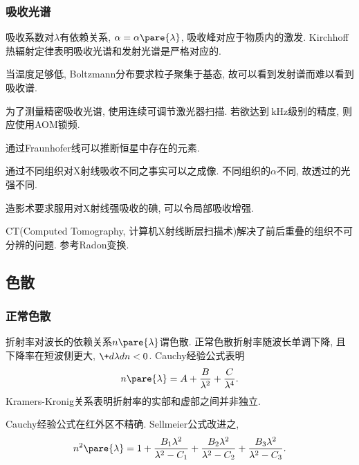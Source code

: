 \documentclass{ctexart}
\begin{document}

\subsubsection{吸收光谱} %
\label{ssub:吸收光谱}

吸收系数对$\lambda$有依赖关系, $\alpha = \alpha\pare{\lambda}$, 吸收峰对应于物质内的激发. Kirchhoff热辐射定律表明吸收光谱和发射光谱是严格对应的.
\begin{remark}
    当温度足够低, Boltzmann分布要求粒子聚集于基态, 故可以看到发射谱而难以看到吸收谱.
\end{remark}
\begin{remark}
    为了测量精密吸收光谱, 使用连续可调节激光器扫描. 若欲达到$\SI{}{\kilo\hertz}$级别的精度, 则应使用AOM锁频.
\end{remark}
\begin{remark}
    通过Fraunhofer线可以推断恒星中存在的元素.
\end{remark}
\begin{ex}
    通过不同组织对X射线吸收不同之事实可以之成像. 不同组织的$\alpha$不同, 故透过的光强不同.
\end{ex}
\begin{ex}
    造影术要求服用对X射线强吸收的碘, 可以令局部吸收增强.
\end{ex}
\begin{ex}
    CT(Computed Tomography, 计算机X射线断层扫描术)解决了前后重叠的组织不可分辨的问题. 参考Radon变换.
\end{ex}



\subsection{色散} %
\label{sub:色散}

\subsubsection{正常色散} %
\label{ssub:正常色散}

折射率对波长的依赖关系$n\pare{\lambda}$谓色散. 正常色散折射率随波长单调下降, 且下降率在短波侧更大, $\displaystyle \+d\lambda dn < 0$. Cauchy经验公式表明
\[ n\pare{\lambda} = A + \frac{B}{\lambda^2} + \frac{C}{\lambda^4}. \]
Kramers-Kronig关系表明折射率的实部和虚部之间并非独立.
\par
Cauchy经验公式在红外区不精确. Sellmeier公式改进之,
\[ n^2\pare{\lambda} = 1 + \frac{B_1\lambda^2}{\lambda^2 - C_1} + \frac{B_2\lambda^2}{\lambda^2 - C_2} + \frac{B_3\lambda^2}{\lambda^2 - C_3}. \]
\end{document}
